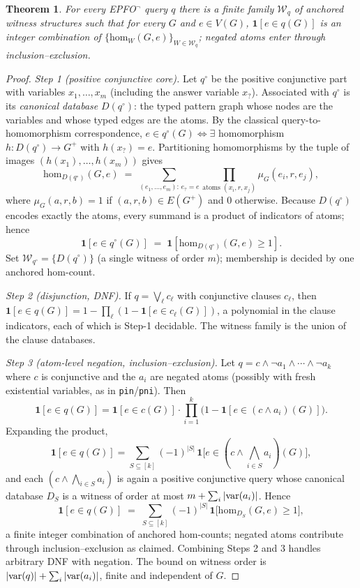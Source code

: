 \documentclass[journal]{IEEEtran}
\newcommand{\homc}{\mathrm{hom}}
\newtheorem{theorem*}{Theorem}
\begin{document}
\begin{theorem*}
For every EPFO$^\neg$ query $q$ there is a finite family $\mathcal W_q$ of
anchored witness structures such that for every $G$ and $e\in V(G)$,
$\mathbf 1[e\in q(G)]$ is an integer combination of
$\{\homc_W(G,e)\}_{W\in\mathcal W_q}$; negated atoms enter through
inclusion--exclusion.
\end{theorem*}
\begin{proof}
\emph{Step 1 (positive conjunctive core).} Let $q^\circ$ be the
positive conjunctive part with variables $x_1,\dots,x_m$ (including the
answer variable $x_?$). Associated with $q^\circ$ is its \emph{canonical
database} $D(q^\circ)$: the typed pattern graph whose nodes are the
variables and whose typed edges are the atoms. By the classical
query-to-homomorphism correspondence,
$e\in q^\circ(G)\iff\exists$ homomorphism $h:D(q^\circ)\to G^{+}$ with
$h(x_?)=e$. Partitioning homomorphisms by the tuple of images
$(h(x_1),\dots,h(x_m))$ gives
\[
\homc_{D(q^\circ)}(G,e) \;=\; \sum_{(e_1,\dots,e_m):\,e_{?}=e}
\prod_{\text{atoms }(x_i,r,x_j)} \mu_G(e_i,r,e_j),
\]
where $\mu_G(a,r,b)=1$ if $(a,r,b)\in E(G^{+})$ and $0$ otherwise. Because
$D(q^\circ)$ encodes exactly the atoms, every summand is a product of
indicators of atoms; hence
\[
\mathbf 1[e\in q^\circ(G)] \;=\; \mathbf 1\!\left[\homc_{D(q^\circ)}(G,e) \ge 1\right].
\]
Set $\mathcal W_{q^\circ}=\{D(q^\circ)\}$ (a single witness of order
$m$); membership is decided by one anchored hom-count.

\emph{Step 2 (disjunction, DNF).} If $q = \bigvee_{\ell} c_\ell$ with
conjunctive clauses $c_\ell$, then
$\mathbf 1[e\in q(G)] = 1-\prod_\ell(1-\mathbf 1[e\in c_\ell(G)])$, a
polynomial in the clause indicators, each of which is Step-1 decidable.
The witness family is the union of the clause databases.

\emph{Step 3 (atom-level negation, inclusion--exclusion).} Let
$q = c \wedge \neg a_1 \wedge \cdots \wedge \neg a_k$ where $c$ is
conjunctive and the $a_i$ are negated atoms (possibly with fresh
existential variables, as in \texttt{pin}/\texttt{pni}). Then
\[
\mathbf 1[e\in q(G)] = \mathbf 1[e\in c(G)]\cdot
\prod_{i=1}^{k}\bigl(1-\mathbf 1[e\in (c\wedge a_i)(G)]\bigr).
\]
Expanding the product,
\[
\mathbf 1[e\in q(G)] = \sum_{S\subseteq[k]} (-1)^{|S|}\,
\mathbf 1\bigl[e\in (c\wedge\bigwedge_{i\in S}a_i)(G)\bigr],
\]
and each $(c\wedge\bigwedge_{i\in S}a_i)$ is again a positive conjunctive
query whose canonical database $D_S$ is a witness of order at most
$m+\sum_{i}|{\rm var}(a_i)|$. Hence
\[
\mathbf 1[e\in q(G)] \;=\; \sum_{S\subseteq[k]}(-1)^{|S|}\,
\mathbf 1\bigl[\homc_{D_S}(G,e)\ge 1\bigr],
\]
a finite integer combination of anchored hom-counts; negated atoms
contribute through inclusion--exclusion as claimed. Combining Steps 2 and
3 handles arbitrary DNF with negation. The bound on witness order is
$|{\rm var}(q)|+\sum_i |{\rm var}(a_i)|$, finite and independent of $G$.
\end{proof}
\end{document}
